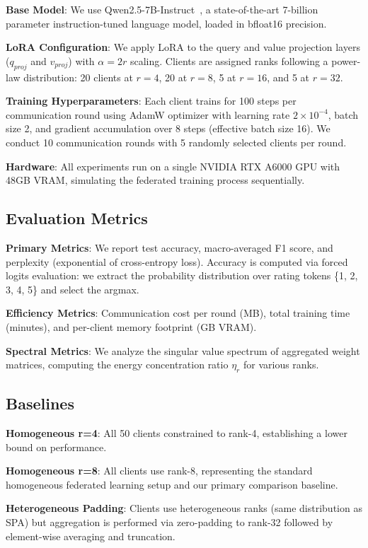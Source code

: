 \documentclass[conference]{IEEEtran}
\begin{document}
\textbf{Base Model}: We use Qwen2.5-7B-Instruct~\cite{qwen2024}, a state-of-the-art 7-billion parameter instruction-tuned language model, loaded in bfloat16 precision.

\textbf{LoRA Configuration}: We apply LoRA to the query and value projection layers ($q_{proj}$ and $v_{proj}$) with $\alpha = 2r$ scaling. Clients are assigned ranks following a power-law distribution: 20 clients at $r=4$, 20 at $r=8$, 5 at $r=16$, and 5 at $r=32$.

\textbf{Training Hyperparameters}: Each client trains for 100 steps per communication round using AdamW optimizer with learning rate $2 \times 10^{-4}$, batch size 2, and gradient accumulation over 8 steps (effective batch size 16). We conduct 10 communication rounds with 5 randomly selected clients per round.

\textbf{Hardware}: All experiments run on a single NVIDIA RTX A6000 GPU with 48GB VRAM, simulating the federated training process sequentially.

\subsection{Evaluation Metrics}

\textbf{Primary Metrics}: We report test accuracy, macro-averaged F1 score, and perplexity (exponential of cross-entropy loss). Accuracy is computed via forced logits evaluation: we extract the probability distribution over rating tokens \{1, 2, 3, 4, 5\} and select the argmax.

\textbf{Efficiency Metrics}: Communication cost per round (MB), total training time (minutes), and per-client memory footprint (GB VRAM).

\textbf{Spectral Metrics}: We analyze the singular value spectrum of aggregated weight matrices, computing the energy concentration ratio $\eta_r$ for various ranks.

\subsection{Baselines}

\textbf{Homogeneous r=4}: All 50 clients constrained to rank-4, establishing a lower bound on performance.

\textbf{Homogeneous r=8}: All clients use rank-8, representing the standard homogeneous federated learning setup and our primary comparison baseline.

\textbf{Heterogeneous Padding}: Clients use heterogeneous ranks (same distribution as SPA) but aggregation is performed via zero-padding to rank-32 followed by element-wise averaging and truncation.
\end{document}
